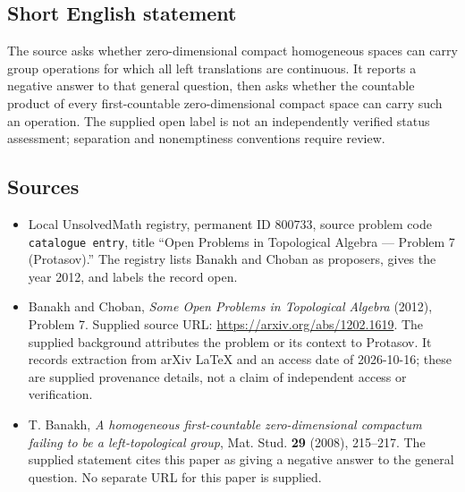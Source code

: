\documentclass[11pt]{article}
\begin{document}
\subsection{Short English statement}
The source asks whether zero-dimensional compact homogeneous spaces can carry group operations for which all left translations are continuous. It reports a negative answer to that general question, then asks whether the countable product of every first-countable zero-dimensional compact space can carry such an operation. The supplied open label is not an independently verified status assessment; separation and nonemptiness conventions require review.
\subsection{Sources}
\begin{itemize}
\item Local UnsolvedMath registry, permanent ID \(800733\), source problem code \texttt{catalogue entry}, title ``Open Problems in Topological Algebra --- Problem 7 (Protasov).'' The registry lists Banakh and Choban as proposers, gives the year 2012, and labels the record open.
\item Banakh and Choban, \emph{Some Open Problems in Topological Algebra} (2012), Problem 7. Supplied source URL: \url{https://arxiv.org/abs/1202.1619}. The supplied background attributes the problem or its context to Protasov. It records extraction from arXiv LaTeX and an access date of 2026-10-16; these are supplied provenance details, not a claim of independent access or verification.
\item T. Banakh, \emph{A homogeneous first-countable zero-dimensional compactum failing to be a left-topological group}, Mat. Stud. \textbf{29} (2008), 215--217. The supplied statement cites this paper as giving a negative answer to the general question. No separate URL for this paper is supplied.
\end{itemize}
\end{document}

